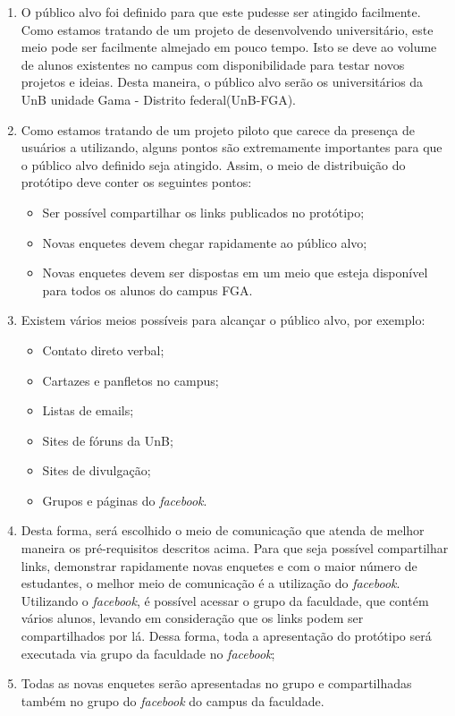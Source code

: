 \begin{enumerate}
    \item O público alvo foi definido para que este pudesse ser atingido facilmente. Como estamos tratando de um
        projeto de desenvolvendo universitário, este meio pode ser facilmente almejado em pouco tempo. Isto se
        deve ao volume de alunos existentes no campus com disponibilidade para testar novos projetos e ideias.
        Desta maneira, o público alvo serão os universitários da UnB unidade Gama - Distrito federal(UnB-FGA).
    \item Como estamos tratando de um projeto piloto que carece da presença de usuários a utilizando, alguns
        pontos são extremamente importantes para que o público alvo definido seja atingido. Assim, o meio de
        distribuição do protótipo deve conter os seguintes pontos:
        \begin{itemize}
            \item Ser possível compartilhar os links publicados no protótipo;
            \item Novas enquetes devem chegar rapidamente ao público alvo;
            \item Novas enquetes devem ser dispostas em um meio que esteja disponível para todos os
                alunos do campus FGA.
        \end{itemize}
    \item Existem vários meios possíveis para alcançar o público alvo, por exemplo:
        \begin{itemize}
            \item Contato direto verbal;
            \item Cartazes e panfletos no campus;
            \item Listas de emails;
            \item Sites de fóruns da UnB;
            \item Sites de divulgação;
            \item Grupos e páginas do \textit{facebook}.
        \end{itemize}
    \item Desta forma, será escolhido o meio de comunicação que atenda de melhor maneira os pré-requisitos descritos acima. Para que
        seja possível compartilhar links, demonstrar rapidamente novas enquetes e com o maior número de estudantes, o melhor meio de
        comunicação é a utilização do \textit{facebook}. Utilizando o \textit{facebook}, é possível acessar o grupo da faculdade, que contém vários alunos,
        levando em consideração que os links podem ser compartilhados por lá. Dessa forma, toda a apresentação do protótipo será executada
        via grupo da faculdade no \textit{facebook};
    \item Todas as novas enquetes serão apresentadas no grupo e compartilhadas também no grupo do \textit{facebook} do campus da faculdade.
\end{enumerate}

